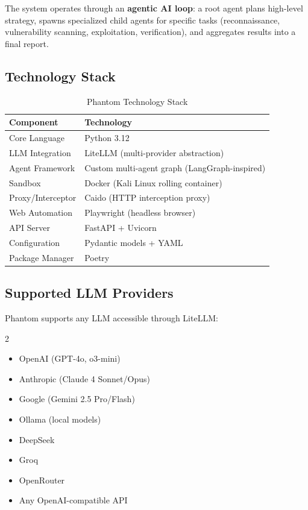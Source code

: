 \documentclass[12pt,a4paper]{article}
\begin{document}
The system operates through an \textbf{agentic AI loop}: a root agent plans
high-level strategy, spawns specialized child agents for specific tasks
(reconnaissance, vulnerability scanning, exploitation, verification), and
aggregates results into a final report.

\subsection{Technology Stack}

\begin{table}[H]
\centering
\caption{Phantom Technology Stack}
\begin{tabularx}{\textwidth}{lX}
\toprule
\textbf{Component} & \textbf{Technology} \\
\midrule
Core Language & Python 3.12 \\
LLM Integration & LiteLLM (multi-provider abstraction) \\
Agent Framework & Custom multi-agent graph (LangGraph-inspired) \\
Sandbox & Docker (Kali Linux rolling container) \\
Proxy/Interceptor & Caido (HTTP interception proxy) \\
Web Automation & Playwright (headless browser) \\
API Server & FastAPI + Uvicorn \\
Configuration & Pydantic models + YAML \\
Package Manager & Poetry \\
\bottomrule
\end{tabularx}
\end{table}

\subsection{Supported LLM Providers}

Phantom supports any LLM accessible through LiteLLM:
\begin{multicols}{2}
\begin{itemize}[nosep]
    \item OpenAI (GPT-4o, o3-mini)
    \item Anthropic (Claude 4 Sonnet/Opus)
    \item Google (Gemini 2.5 Pro/Flash)
    \item Ollama (local models)
    \item DeepSeek
    \item Groq
    \item OpenRouter
    \item Any OpenAI-compatible API
\end{itemize}
\end{multicols}
\end{document}
